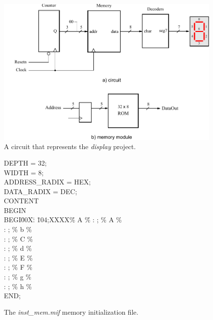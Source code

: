 {

\begin{figure}[t]
	\begin{center}
		\includegraphics[scale = 1.0]{figures/figdisplay.pdf}
	\end{center}
          \caption{A circuit that represents the {\it display} project.}
	\label{fig:memory}
\end{figure}

\begin{figure}[bh!]
\begin{center}
\begin{minipage}[t]{12.5 cm}
\begin{tabbing}
DEPTH = 32;\\
WIDTH = 8;\\
ADDRESS\_RADIX = HEX;\\
DATA\_RADIX = DEC;\\
CONTENT\\
BEGIN\\
BEGI\=00X\=: \=104;XXXX\=\% A \=\% \kill
{} \>: ;    \>\% A \>\%\\
 \>: ;    \>\% b \>\%\\
 \>: ;    \>\% C \>\%\\
 \>: ;   \>\% d \>\%\\
 \>: ;    \>\% E \>\%\\
 \>: ;    \>\% F \>\%\\
 \>: ;   \>\% g \>\%\\
 \>: ;   \>\% h \>\%\\
END;
\end{tabbing}
\end{minipage}
\end{center}
    \caption{The {\it inst\_mem.mif} memory initialization file.}
\label{fig:mif}
\end{figure}

}
